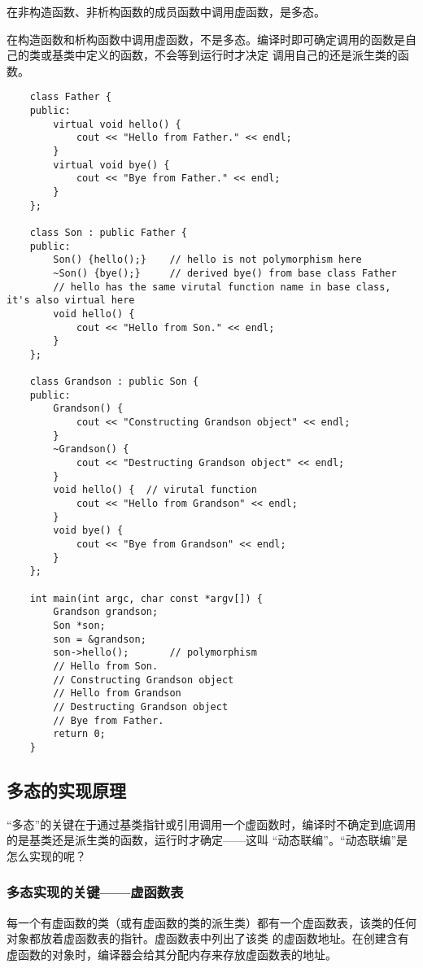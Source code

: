 \documentclass[UTF8]{ctexart}
\begin{document}
在非构造函数、非析构函数的成员函数中调用虚函数，是多态。

在构造函数和析构函数中调用虚函数，不是多态。编译时即可确定调用的函数是自己的类或基类中定义的函数，不会等到运行时才决定
调用自己的还是派生类的函数。

\begin{verbatim}
    class Father {
    public:
        virtual void hello() {
            cout << "Hello from Father." << endl;
        }
        virtual void bye() {
            cout << "Bye from Father." << endl;
        }
    };

    class Son : public Father {
    public:
        Son() {hello();}    // hello is not polymorphism here
        ~Son() {bye();}     // derived bye() from base class Father
        // hello has the same virutal function name in base class, it's also virtual here
        void hello() {
            cout << "Hello from Son." << endl;
        }
    };

    class Grandson : public Son {
    public:
        Grandson() {
            cout << "Constructing Grandson object" << endl;
        }
        ~Grandson() {
            cout << "Destructing Grandson object" << endl;
        }
        void hello() {  // virutal function
            cout << "Hello from Grandson" << endl;
        }
        void bye() {
            cout << "Bye from Grandson" << endl;
        }
    };

    int main(int argc, char const *argv[]) {
        Grandson grandson;
        Son *son;
        son = &grandson;
        son->hello();       // polymorphism
        // Hello from Son.
        // Constructing Grandson object
        // Hello from Grandson
        // Destructing Grandson object
        // Bye from Father.
        return 0;
    }
\end{verbatim}

\subsection{多态的实现原理}
“多态”的关键在于通过基类指针或引用调用一个虚函数时，编译时不确定到底调用的是基类还是派生类的函数，运行时才确定——这叫
“动态联编”。“动态联编”是怎么实现的呢？

\subsubsection{多态实现的关键——虚函数表}
每一个有虚函数的类（或有虚函数的类的派生类）都有一个虚函数表，该类的任何对象都放着虚函数表的指针。虚函数表中列出了该类
的虚函数地址。在创建含有虚函数的对象时，编译器会给其分配内存来存放虚函数表的地址。
\end{document}

